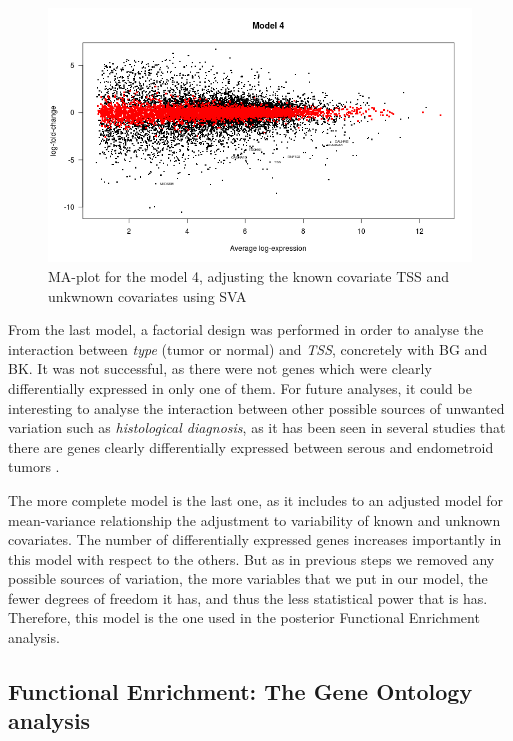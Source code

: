 \documentclass[9pt,twocolumn,twoside]{gsajnl}
\begin{document}
\begin{figure}[htbp]
\centering
\includegraphics[width=\linewidth]{maPlot-1}
\caption{MA-plot for the model 4, adjusting the known covariate TSS and unkwnown covariates using SVA}
\label{fig:MAplot}
\end{figure}

From the last model, a factorial design was performed in order to analyse the interaction between \textit{type} (tumor or normal) and \textit{TSS}, concretely with BG and BK. It was not successful, as there were not genes which were clearly differentially expressed in only one 	of them. For future analyses, it could be interesting to analyse the interaction between other possible sources of unwanted variation such as \textit{histological diagnosis}, as it has been seen in several studies that there are genes clearly differentially expressed between serous and endometroid tumors \citep{Getz2013}.

The more complete model is the last one, as it includes to an adjusted model for mean-variance relationship the adjustment to variability of known and unknown covariates. The number of differentially expressed genes increases importantly in this model with respect to the others. But as in previous steps we removed any possible sources of variation, the more variables that we put in our model, the fewer degrees of freedom it has, and thus the less statistical power that is has. Therefore, this model is the one used in the posterior Functional Enrichment analysis.

\subsection{Functional Enrichment: The Gene Ontology analysis}
\end{document}

